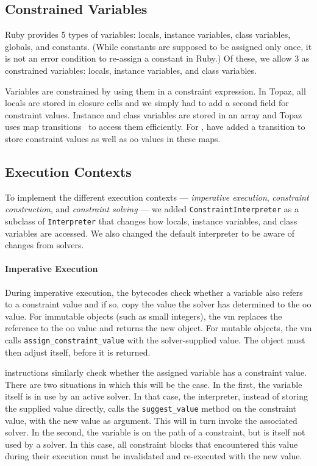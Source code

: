\subsection{Constrained Variables}
\label{sec:constrained-variables-impl}
Ruby provides 5 types of variables: locals, instance variables, class
variables, globals, and constants.  (While constants are supposed to
be assigned only once, it is not an error condition to re-assign a
constant in Ruby.)  Of these, we allow 3 as constrained variables:
locals, instance variables, and class variables.

Variables are constrained by using them in a constraint expression. In
Topaz, all locals are stored in closure cells and we simply had to add
a second field for constraint values. Instance and class variables are
stored in an array and Topaz uses map
transitions~\cite{chambers1989efficient} to access them
efficiently. For \toolname, have added a transition to store
constraint values as well as \ac{oo} values in these maps.

\subsection{Execution Contexts}
\label{sec:constraint-construction-impl}

To implement the different execution contexts --- \emph{imperative
  execution}, \emph{constraint construction}, and \emph{constraint
  solving} --- we added \lstinline{ConstraintInterpreter} as a subclass
of \lstinline{Interpreter} that changes how locals, instance
variables, and class variables are accessed. We also changed the
default interpreter to be aware of changes from solvers.

\paragraph{Imperative Execution}
During imperative execution, the \load bytecodes check whether a
variable also refers to a constraint value and if so, copy the value
the solver has determined to the \ac{oo} value. For immutable objects
(such as small integers), the \ac{vm} replaces the reference to the
\ac{oo} value and returns the new object. For mutable objects, the
\ac{vm} calls \lstinline{assign_constraint_value} with the
solver-supplied value. The object must then adjust itself, before it
is returned.

\store instructions similarly check whether the assigned variable has
a constraint value.  There are two situations in which this will be
the case.  In the first, the variable itself is in use by an active
solver. In that case, the interpreter, instead of storing the supplied
value directly, calls the \lstinline{suggest_value} method on the
constraint value, with the new value as argument.  This will in turn
invoke the associated solver.  In the second, the variable is on the
path of a constraint, but is itself not used by a solver.  In this
case, all constraint blocks that encountered this value during their
execution must be invalidated and re-executed with the new value.

